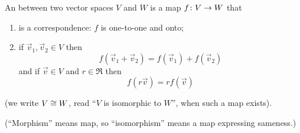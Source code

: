 \begin{definition}
\label{def:Isomorphism}
An %
between two vector spaces $V$ and $W$
is a map \( \mbox{$f\colon V\to W$} \) that
\begin{enumerate}
  \item is a correspondence:
     \( f \) is one-to-one and onto;\footnotemark %
  \item {}
   if \( \vec{v}_1,\vec{v}_2\in V \) then
   \begin{equation*}
      f(\vec{v}_1+\vec{v}_2)=f(\vec{v}_1)+f(\vec{v}_2)
   \end{equation*}
   and if \( \vec{v}\in V \) and \( r\in\Re \) then
   \begin{equation*}
         f(r\vec{v})=r{}f(\vec{v})  %
   \end{equation*}
\end{enumerate}
(we write \( V\cong W \), read ``\( V \) is isomorphic to \( W \)'',
when such a map exists).
\end{definition}

\noindent (``Morphism'' means map, 
so ``isomorphism'' means a map expressing sameness.)

